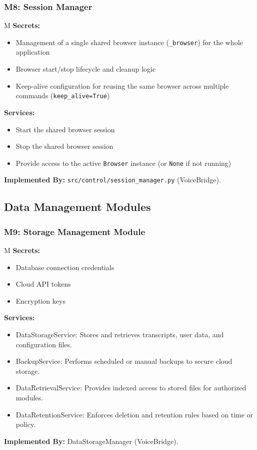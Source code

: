\documentclass[12pt, titlepage]{article}
\newcounter{mnum}
\newcommand{\mthemnum}{M\themnum}
\begin{document}
\medskip
\subsubsection*{M8: Session Manager} \mthemnum\label{m8}
\textbf{Secrets:}
\begin{itemize}
  \item Management of a single shared browser instance (\texttt{\_browser}) for the whole application
  \item Browser start/stop lifecycle and cleanup logic
  \item Keep-alive configuration for reusing the same browser across multiple commands (\texttt{keep\_alive=True})
\end{itemize}
\textbf{Services:}
\begin{itemize}
  \item Start the shared browser session
  \item Stop the shared browser session
  \item Provide access to the active \texttt{Browser} instance (or \texttt{None} if not running)
\end{itemize}
\textbf{Implemented By:} \texttt{src/control/session\_manager.py} (VoiceBridge).

\subsection*{Data Management Modules}
\medskip
\subsubsection*{M9: Storage Management Module} \mthemnum\label{m9}
\textbf{Secrets:}
\begin{itemize}
  \item Database connection credentials
  \item Cloud API tokens
  \item Encryption keys
\end{itemize}
\textbf{Services:}
\begin{itemize}
  \item DataStorageService: Stores and retrieves transcripts, user data, and configuration files.
  \item BackupService: Performs scheduled or manual backups to secure cloud storage.
  \item DataRetrievalService: Provides indexed access to stored files for authorized modules.
  \item DataRetentionService: Enforces deletion and retention rules based on time or policy.
\end{itemize}
\textbf{Implemented By:} DataStorageManager (VoiceBridge).
\end{document}
